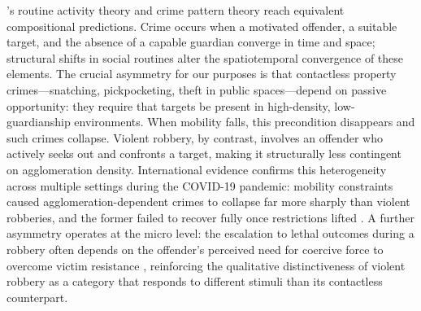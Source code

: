 \documentclass[pdflatex,sn-basic]{sn-jnl}
\begin{document}
\citet{cohen1979}'s routine activity theory and crime pattern theory \citep{brantingham1984} reach equivalent compositional predictions. Crime occurs when a motivated offender, a suitable target, and the absence of a capable guardian converge in time and space; structural shifts in social routines alter the spatiotemporal convergence of these elements. The crucial asymmetry for our purposes is that contactless property crimes---snatching, pickpocketing, theft in public spaces---depend on passive opportunity: they require that targets be present in high-density, low-guardianship environments. When mobility falls, this precondition disappears and such crimes collapse. Violent robbery, by contrast, involves an offender who actively seeks out and confronts a target, making it structurally less contingent on agglomeration density. International evidence confirms this heterogeneity across multiple settings during the COVID-19 pandemic: mobility constraints caused agglomeration-dependent crimes to collapse far more sharply than violent robberies, and the former failed to recover fully once restrictions lifted \citep{nivette2021,ashby2020,halford2020,meyer2022,stickle2020,seyidoglu2024,zheng2025,regalado2022}. A further asymmetry operates at the micro level: the escalation to lethal outcomes during a robbery often depends on the offender's perceived need for coercive force to overcome victim resistance \citep{bowman2024}, reinforcing the qualitative distinctiveness of violent robbery as a category that responds to different stimuli than its contactless counterpart.
\end{document}
